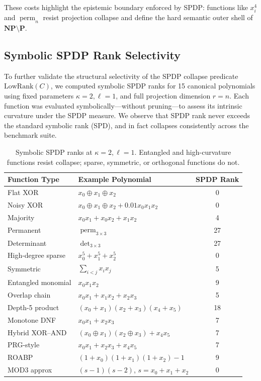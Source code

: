 \documentclass[12pt]{article}
\DeclareMathOperator{\perm}{perm}
\theoremstyle{definition}
\theoremstyle{definition}
\theoremstyle{remark}
\theoremstyle{remark}
\begin{document}
These costs highlight the epistemic boundary enforced by SPDP: functions like $x_i^4$ and $\perm_n$ resist projection collapse and define the hard semantic outer shell of $\mathbf{NP} \setminus \mathbf{P}$.

\subsection{Symbolic SPDP Rank Selectivity}

To further validate the structural selectivity of the SPDP collapse predicate $\text{LowRank}(C)$, we computed symbolic SPDP ranks for 15 canonical polynomials using fixed parameters $\kappa = 2, \ell = 1$, and full projection dimension $r = n$. Each function was evaluated symbolically---without pruning---to assess its intrinsic curvature under the SPDP measure. We observe that SPDP rank never exceeds the standard symbolic rank (SPD), and in fact collapses consistently across the benchmark suite.

\begin{table}[h]
\centering
\caption{Symbolic SPDP ranks at $\kappa = 2, \ell = 1$. Entangled and high-curvature functions resist collapse; sparse, symmetric, or orthogonal functions do not.}
\label{tab:symbolic-ranks}
\begin{tabular}{|l|l|c|}
\hline
\textbf{Function Type} & \textbf{Example Polynomial} & \textbf{SPDP Rank} \\
\hline
Flat XOR & $x_0 \oplus x_1 \oplus x_2$ & 0 \\
Noisy XOR & $x_0 \oplus x_1 \oplus x_2 + 0.01x_0x_1x_2$ & 0 \\
Majority & $x_0x_1 + x_0x_2 + x_1x_2$ & 4 \\
Permanent & $\perm_{3 \times 3}$ & 27 \\
Determinant & $\det_{3 \times 3}$ & 27 \\
High-degree sparse & $x_0^5 + x_1^5 + x_2^5$ & 0 \\
Symmetric & $\sum_{i<j} x_ix_j$ & 5 \\
Entangled monomial & $x_0x_1x_2$ & 9 \\
Overlap chain & $x_0x_1 + x_1x_2 + x_2x_3$ & 5 \\
Depth-5 product & $(x_0+x_1)(x_2+x_3)(x_4+x_5)$ & 18 \\
Monotone DNF & $x_0x_1 + x_2x_3$ & 7 \\
Hybrid XOR--AND & $(x_0 \oplus x_1)(x_2 \oplus x_3) + x_4x_5$ & 7 \\
PRG-style & $x_0x_1 + x_2x_3 + x_4x_5$ & 7 \\
ROABP & $(1+x_0)(1+x_1)(1+x_2) - 1$ & 9 \\
MOD3 approx & $(s-1)(s-2)$, $s = x_0 + x_1 + x_2$ & 0 \\
\hline
\end{tabular}
\end{table}
\end{document}
